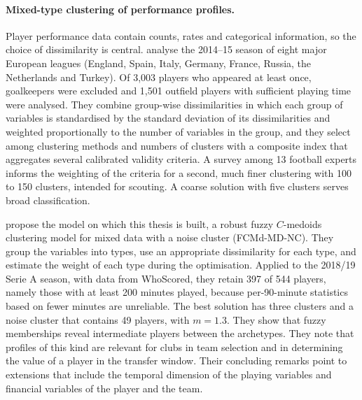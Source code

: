 \paragraph{Mixed-type clustering of performance profiles.} Player performance data contain counts, rates and categorical information, so the choice of dissimilarity is central.  analyse the 2014--15 season of eight major European leagues (England, Spain, Italy, Germany, France, Russia, the Netherlands and Turkey). Of 3,003 players who appeared at least once, goalkeepers were excluded and 1,501 outfield players with sufficient playing time were analysed. They combine group-wise dissimilarities in which each group of variables is standardised by the standard deviation of its dissimilarities and weighted proportionally to the number of variables in the group, and they select among clustering methods and numbers of clusters with a composite index that aggregates several calibrated validity criteria. A survey among 13 football experts informs the weighting of the criteria for a second, much finer clustering with 100 to 150 clusters, intended for scouting. A coarse solution with five clusters serves broad classification.

 propose the model on which this thesis is built, a robust fuzzy $C$-medoids clustering model for mixed data with a noise cluster (FCMd-MD-NC). They group the variables into types, use an appropriate dissimilarity for each type, and estimate the weight of each type during the optimisation. Applied to the 2018/19 Serie A season, with data from WhoScored, they retain 397 of 544 players, namely those with at least 200 minutes played, because per-90-minute statistics based on fewer minutes are unreliable. The best solution has three clusters and a noise cluster that contains 49 players, with $m=1.3$. They show that fuzzy memberships reveal intermediate players between the archetypes. They note that profiles of this kind are relevant for clubs in team selection and in determining the value of a player in the transfer window. Their concluding remarks point to extensions that include the temporal dimension of the playing variables and financial variables of the player and the team.

